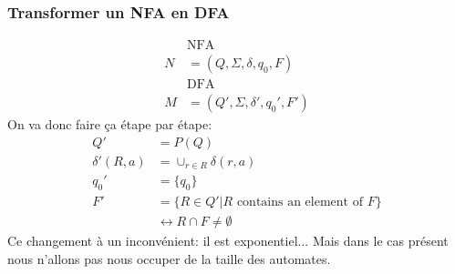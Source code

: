 \documentclass[a4paper,12pt]{article}
\begin{document}
    \subsubsection{Transformer un NFA en DFA}
      \begin{align*}
	&\text{NFA} \\
	N &= (Q, \Sigma, \delta, q_0, F)\\
	&\text{DFA} \\
	M &= (Q', \Sigma, \delta', q_0', F')
      \end{align*}
      On va donc faire ça étape par étape:
      \begin{align*}
	Q' &= P(Q)\\
	\delta'(R, a) &= \cup_{r \in R} \delta(r, a)\\
	q_0' &= \{q_0\}\\
	F' &= \{R \in Q' | R \text{ contains an element of } F\}\\
	& \leftrightarrow R \cap F \neq \emptyset
      \end{align*}
      Ce changement à un inconvénient: il est exponentiel...  Mais dans le cas présent nous n'allons pas nous occuper de la taille des automates.
    
    
\end{document}
